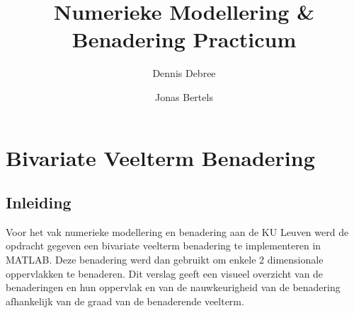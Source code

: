 \documentclass[a4paper]{article}
\title{Numerieke Modellering \& Benadering Practicum}
\author{Dennis Debree}
\author{Jonas Bertels}
\affil{KU Leuven Departement Computerwetenschappen}
\begin{document}
\maketitle
\section{Bivariate Veelterm Benadering}
\subsection{Inleiding}
Voor het vak numerieke modellering en benadering aan de KU Leuven werd de opdracht gegeven een bivariate veelterm benadering te implementeren in MATLAB. Deze benadering werd dan gebruikt om enkele 2 dimensionale oppervlakken te benaderen. Dit verslag geeft een visueel overzicht van de benaderingen en hun oppervlak en van de nauwkeurigheid van de benadering afhankelijk van de graad van de benaderende veelterm.
\end{document}
